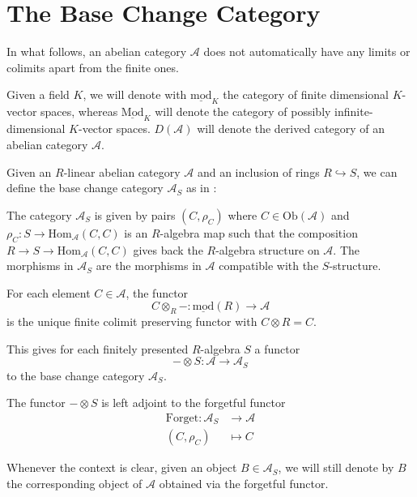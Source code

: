 \documentclass{amsart}
\begin{document}
\section{The Base Change Category}
In what follows, an abelian category $\mathcal{A}$ does not automatically have any limits or colimits apart from the finite ones. 

Given a field $K$, we will denote with $\underline{\mathrm{mod}}_{K}$ the category of finite dimensional $K$-vector spaces, whereas $\underline{\mathrm{Mod}}_{K}$ will denote the category of possibly infinite-dimensional $K$-vector spaces. $D(\mathcal{A})$ will denote the derived category of an abelian category $\mathcal{A}$.

Given an $R$-linear abelian category $\mathcal{A}$ and an inclusion of rings $R\hookrightarrow S$, we can define the base change category $\mathcal{A}_{S}$ as in \cite[]{deformation}:
\begin{definition}
The category $\mathcal{A}_{S}$ is given by pairs $(C,\rho_{C})$ where $C\in \mathrm{Ob}(\mathcal{A})$ and $\rho_{C}:S\to \mathrm{Hom}_{\mathcal{A}}(C,C)$ is an $R$-algebra map such that the composition $R\to S \to \mathrm{Hom}_{\mathcal{A}}(C,C)$ gives back the $R$-algebra structure on $\mathcal{A}$. The morphisms in $\mathcal{A}_{S}$ are the morphisms in $\mathcal{A}$ compatible with the $S$-structure.
\end{definition}

\begin{definition}\label{tensoring}
For  each element $C\in \mathcal{A}$, the functor
$$C \otimes_{R}-: \underline{\mathrm{mod}}(R)\to \mathcal{A}$$
is the unique finite colimit preserving functor with $C\otimes R=C$.

This gives for each finitely presented $R$-algebra $S$ a functor
$$-\otimes S:\mathcal{A} {\rightarrow} \mathcal{A}_{S}$$
to the base change category $\mathcal{A}_{S}$.
\end{definition}

\begin{proposition}\cite[Proposition 4.3]{deformation}\label{tensor adjointness}
The functor $-\otimes S$ is left adjoint to the forgetful functor
\begin{align*}
\mathrm{Forget}:\mathcal{A}_{S} &{\rightarrow} \mathcal{A}\\
(C,\rho_{C}) &\mapsto C
\end{align*}
\end{proposition}
Whenever the context is clear, given an object $B\in \mathcal{A}_{S}$, we will still denote by $B$ the corresponding object of $\mathcal{A}$ obtained via the forgetful functor.
\end{document}
